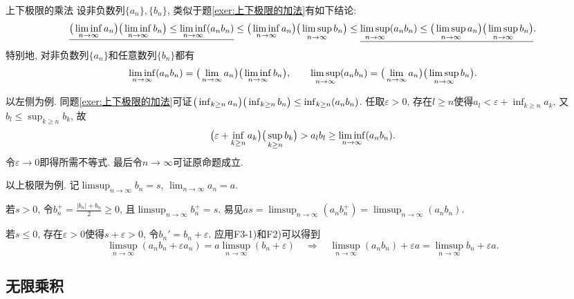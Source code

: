 \begin{exercise}{上下极限的乘法}
	设非负数列$\{ a_n \}, \{ b_n \}$, 类似于题\ref{exer:上下极限的加法}有如下结论: 
$$\underline{\big( \liminf_{n\to \infty} a_n \big)\big(  \liminf_{n\to \infty} b_n \big) \leq \liminf_{n\to \infty} (a_nb_n) }\leq \big( \liminf_{n\to \infty} a_n \big)\big(  \limsup_{n\to \infty} b_n \big) \leq \underline{\limsup_{n\to \infty} (a_nb_n) \leq \big( \limsup_{n\to \infty} a_n \big)\big(  \limsup_{n\to \infty} b_n \big)}.$$
	特别地, 对非负数列$\{ a_n \}$和任意数列$\{ b_n \}$都有$$\liminf_{n\to \infty} (a_nb_n) = \big( \lim_{n\to \infty} a_n \big) \big( \liminf_{n\to \infty} b_n \big), \qquad \limsup_{n\to \infty} (a_nb_n) = \big( \lim_{n\to \infty} a_n \big) \big( \limsup_{n\to \infty} b_n \big).$$
\end{exercise}
\begin{solution}
	以左侧为例. 同题\ref{exer:上下极限的加法}可证$\big( \inf_{k\geq n}a_n \big) \big( \inf_{k\geq n}b_n \big) \leq \inf_{k\geq n}(a_nb_n)$. 任取$\varepsilon >0$, 存在$l \geq n$使得$a_l < \varepsilon + \inf_{k\geq n} a_k$, 又$b_l \leq \sup_{k\geq n}b_k$, 故$$\big( \varepsilon + \inf_{k\geq n} a_k \big) \big( \sup_{k\geq n}b_k \big) >a_lb_l \geq \liminf_{n\to \infty} (a_nb_n). $$
	令$\varepsilon \to 0$即得所需不等式. 最后令$n\to \infty$可证原命题成立. 
\end{solution}
\begin{solution}
	以上极限为例. 记$\limsup_{n\to \infty} b_n=s$, $\lim_{n\to \infty} a_n =a$. 
	
	若$s>0$, 令$b_n^+=\frac{|b_n|+b_n}{2} \geq 0$, 且$\limsup_{n\to \infty} b_n^+ = s$. 易见$as = \limsup_{n\to \infty}(a_nb_n^+) = \limsup_{n\to \infty}(a_nb_n)$. 
	
	若$s \leq 0$, 存在$\varepsilon >0$使得$s + \varepsilon >0$, 令$b_n' = b_n+\varepsilon$. 应用F3-1)和F2)可以得到$$\limsup_{n\to \infty}(a_nb_n+\varepsilon a_n) = a\limsup_{n\to \infty} (b_n+\varepsilon) \quad \Rightarrow \quad  \limsup_{n\to \infty} (a_nb_n) + \varepsilon a = \limsup_{n\to \infty} b_n + \varepsilon a. $$
\end{solution}

\clearpage
\subsection{无限乘积}


